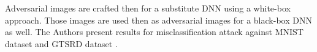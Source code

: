  Adversarial images are crafted then for a substitute DNN using a white-box approach. Those images are used then as adversarial images for a black-box DNN as well.
The Authors present results for misclassification attack against MNIST dataset and GTSRD dataset \cite{datasetGTSRD}. 
